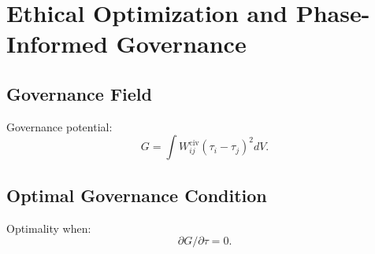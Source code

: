 \chapter{Ethical Optimization and Phase-Informed Governance}

\section{Governance Field}
Governance potential:
\[
G = \int W^{\mathrm{civ}}_{ij}(\tau_i - \tau_j)^2 dV.
\]

\section{Optimal Governance Condition}
Optimality when:
\[
\partial G/\partial\tau = 0.
\]
